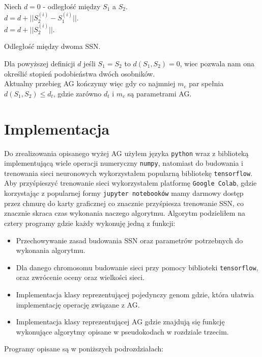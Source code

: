 \documentclass{article}
\begin{document}
\begin{algorithm}[H]
	Niech $d = 0$ - odległość między $S_1$ a $S_2$.\\
	 {
		$d = d + ||S_2^{(i)} - S_1^{(i)}||$.\\
	}
	 {
		$d = d + ||S_2^{(i)}||$.\\
	}
	\caption{Odległość między dwoma SSN.}
\end{algorithm}

Dla powyższej definicji $d$ jeśli $S_1 = S_2$ to $d(S_1, S_2) = 0$, wiec pozwala nam ona określić
stopień podobieństwa dwóch osobników.\\
Aktualny przebieg AG kończymy więc gdy co najmniej $m_c$ par spełnia $d(S_1, S_2) \leq d_t$,
gdzie zarówno $d_t$ i $m_c$ są parametrami AG.


\section{Implementacja}
Do zrealizowania opisanego wyżej AG użyłem języka \texttt{python} wraz z biblioteką 
implementującą wiele operacji numeryczny \texttt{numpy}, natomiast do budowania i trenowania
sieci neuronowych wykorzystałem popularną bibliotekę \texttt{tensorflow}. Aby przyśpieszyć
trenowanie sieci wykorzystałem platformę \texttt{Google Colab}, gdzie korzystając z popularnej
formy \texttt{jupyter notebooków} mamy darmowy dostęp przez chmurę do karty graficznej
co znacznie przyśpiesza trenowanie SSN, co znacznie skraca czas wykonania naczego algorytmu.
Algorytm podzieliłem na cztery programy gdzie każdy wykonuję jedną z funkcji:
\begin{itemize}
\item Przechowywanie zasad budowania SSN oraz parametrów potrzebnych do wykonania algorytmu.
\item Dla danego chromosomu budowanie sieci przy pomocy biblioteki \texttt{tensorflow}, oraz
zwrócenie oceny oraz wielkości sieci.
\item Implementacja klasy reprezentującej pojedynczy genom gdzie, która ułatwia implementację
operację związane z AG.
\item Implementacja klasy reprezentującej AG gdzie znajdują się funkcję wykonujące algorytmy
opisane w pseudokodach w rozdziale trzecim.
\end{itemize}
Programy opisane są w poniższych podrozdziałach:\\
\end{document}
